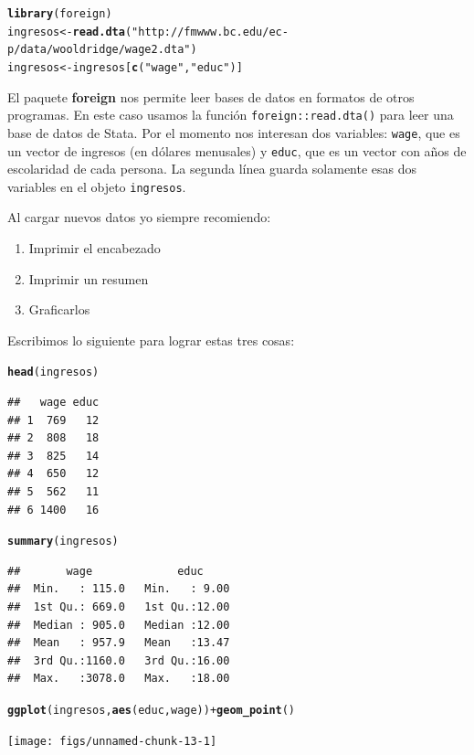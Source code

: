 \documentclass{article}\usepackage[]{graphicx}\usepackage[]{color}
\makeatletter
\newcommand{\hlstr}[1]{\textcolor[rgb]{0.192,0.494,0.8}{#1}}%
\newcommand{\hlopt}[1]{\textcolor[rgb]{0,0,0}{#1}}%
\newcommand{\hlstd}[1]{\textcolor[rgb]{0.345,0.345,0.345}{#1}}%
\newcommand{\hlkwb}[1]{\textcolor[rgb]{0.69,0.353,0.396}{#1}}%
\newcommand{\hlkwd}[1]{\textcolor[rgb]{0.737,0.353,0.396}{\textbf{#1}}}%
\newenvironment{kframe}{%
 \def\at@end@of@kframe{}%
 \ifinner\ifhmode%
  \def\at@end@of@kframe{\end{minipage}}%
  \begin{minipage}{\columnwidth}%
 \fi\fi%
 \def\FrameCommand##1{\hskip\@totalleftmargin \hskip-\fboxsep
 \colorbox{shadecolor}{##1}\hskip-\fboxsep
     \hskip-\linewidth \hskip-\@totalleftmargin \hskip\columnwidth}%
 \MakeFramed {\advance\hsize-\width
   \@totalleftmargin\z@ \linewidth\hsize
   \@setminipage}}%
 {\par\unskip\endMakeFramed%
 \at@end@of@kframe}
\newenvironment{knitrout}{}{} %
\newcommand*{\paq}[1]{\textbf{#1}}
\makeatother
\begin{document}
\begin{knitrout}
\color{fgcolor}\begin{kframe}
\begin{alltt}
\hlkwd{library}\hlstd{(foreign)}
\hlstd{ingresos} \hlkwb{<-} \hlkwd{read.dta}\hlstd{(}\hlstr{"http://fmwww.bc.edu/ec-p/data/wooldridge/wage2.dta"}\hlstd{)}
\hlstd{ingresos} \hlkwb{<-} \hlstd{ingresos[}\hlkwd{c}\hlstd{(}\hlstr{"wage"}\hlstd{,}\hlstr{"educ"}\hlstd{)]}
\end{alltt}
\end{kframe}
\end{knitrout}

El paquete \paq{foreign} nos permite leer bases de datos en formatos de otros programas. En este caso usamos la función \verb|foreign::read.dta()| para leer una base de datos de Stata.
Por el momento nos interesan dos variables: \verb|wage|, que es un vector de ingresos (en dólares menusales) y \verb|educ|, que es un vector con años de escolaridad de cada persona. La segunda línea guarda solamente esas dos variables en el objeto \verb|ingresos|.

Al cargar nuevos datos yo siempre recomiendo:
\begin{enumerate}
\item Imprimir el encabezado
\item Imprimir un resumen
\item Graficarlos
\end{enumerate}

Escribimos lo siguiente para lograr estas tres cosas:

\begin{knitrout}
\color{fgcolor}\begin{kframe}
\begin{alltt}
\hlkwd{head}\hlstd{(ingresos)}
\end{alltt}
\begin{verbatim}
##   wage educ
## 1  769   12
## 2  808   18
## 3  825   14
## 4  650   12
## 5  562   11
## 6 1400   16
\end{verbatim}
\begin{alltt}
\hlkwd{summary}\hlstd{(ingresos)}
\end{alltt}
\begin{verbatim}
##       wage             educ      
##  Min.   : 115.0   Min.   : 9.00  
##  1st Qu.: 669.0   1st Qu.:12.00  
##  Median : 905.0   Median :12.00  
##  Mean   : 957.9   Mean   :13.47  
##  3rd Qu.:1160.0   3rd Qu.:16.00  
##  Max.   :3078.0   Max.   :18.00
\end{verbatim}
\begin{alltt}
\hlkwd{ggplot}\hlstd{(ingresos,} \hlkwd{aes}\hlstd{(educ, wage))} \hlopt{+} \hlkwd{geom_point}\hlstd{()}
\end{alltt}
\end{kframe}

{\centering \texttt{[image: figs/unnamed-chunk-13-1]} 

}



\end{knitrout}
\end{document}
